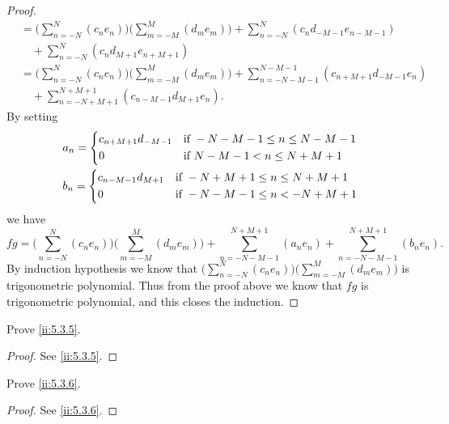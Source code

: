 \begin{proof}
\begin{align*}
        & = \bigg(\sum_{n = -N}^N (c_n e_n)\bigg) \bigg(\sum_{m = -M}^M (d_m e_m)\bigg) + \sum_{n = -N}^N (c_n d_{-M - 1} e_{n - M - 1})                   \\
        & \quad + \sum_{n = -N}^N (c_n d_{M + 1} e_{n + M + 1})                                                                                            \\
        & = \bigg(\sum_{n = -N}^N (c_n e_n)\bigg) \bigg(\sum_{m = -M}^M (d_m e_m)\bigg) + \sum_{n = -N - M - 1}^{N - M - 1} (c_{n + M + 1} d_{-M - 1} e_n) \\
        & \quad + \sum_{n = -N + M + 1}^{N + M + 1} (c_{n - M - 1} d_{M + 1} e_n).
  \end{align*}
  By setting
  \begin{align*}
     & a_n = \begin{dcases}
               c_{n + M + 1} d_{-M - 1} & \text{if } -N - M - 1 \leq n \leq N - M - 1 \\
               0                        & \text{if } N - M - 1 < n \leq N + M + 1
             \end{dcases} \\
     & b_n = \begin{dcases}
               c_{n - M - 1} d_{M + 1} & \text{if } -N + M + 1 \leq n \leq N + M + 1 \\
               0                       & \text{if } -N - M - 1 \leq n < -N + M + 1
             \end{dcases}
  \end{align*}
  we have
  \[
    fg = \bigg(\sum_{n = -N}^N (c_n e_n)\bigg) \bigg(\sum_{m = -M}^M (d_m e_m)\bigg) + \sum_{n = -N - M - 1}^{N + M + 1} (a_n e_n) + \sum_{n = -N - M - 1}^{N + M + 1} (b_n e_n).
  \]
  By induction hypothesis we know that \(\bigg(\sum_{n = -N}^N (c_n e_n)\bigg) \bigg(\sum_{m = -M}^M (d_m e_m)\bigg)\) is trigonometric polynomial.
  Thus from the proof above we know that \(fg\) is trigonometric polynomial, and this closes the induction.
\end{proof}

\begin{ex}\label{ii:ex:5.3.2}
  Prove \cref{ii:5.3.5}.
\end{ex}

\begin{proof}
  See \cref{ii:5.3.5}.
\end{proof}

\begin{ex}\label{ii:ex:5.3.3}
  Prove \cref{ii:5.3.6}.
\end{ex}

\begin{proof}
  See \cref{ii:5.3.6}.
\end{proof}
